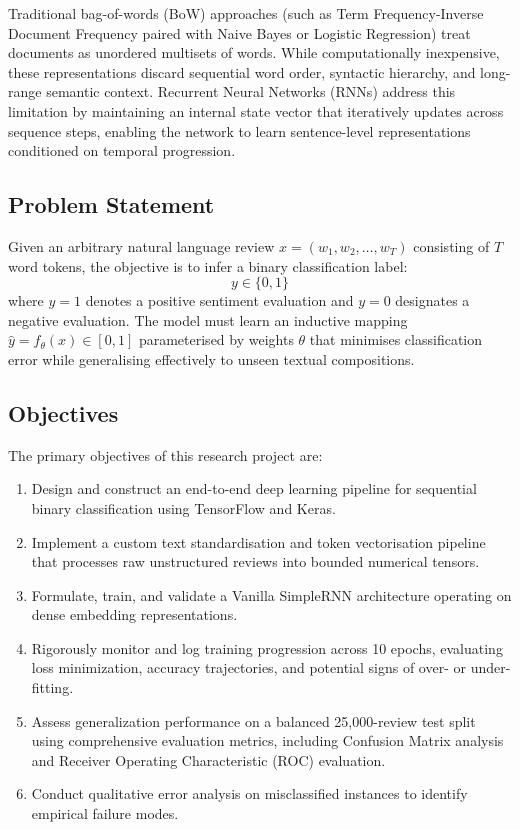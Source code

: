 \documentclass[11pt,a4paper]{article}
\begin{document}
Traditional bag-of-words (BoW) approaches (such as Term Frequency-Inverse Document Frequency paired with Naive Bayes or Logistic Regression) treat documents as unordered multisets of words. While computationally inexpensive, these representations discard sequential word order, syntactic hierarchy, and long-range semantic context. Recurrent Neural Networks (RNNs) address this limitation by maintaining an internal state vector that iteratively updates across sequence steps, enabling the network to learn sentence-level representations conditioned on temporal progression.

\subsection{Problem Statement}
Given an arbitrary natural language review $x = (w_1, w_2, \dots, w_T)$ consisting of $T$ word tokens, the objective is to infer a binary classification label:
\begin{equation}
y \in \{0, 1\}
\end{equation}
where $y = 1$ denotes a positive sentiment evaluation and $y = 0$ designates a negative evaluation. The model must learn an inductive mapping $\hat{y} = f_\theta(x) \in [0, 1]$ parameterised by weights $\theta$ that minimises classification error while generalising effectively to unseen textual compositions.

\subsection{Objectives}
The primary objectives of this research project are:
\begin{enumerate}
    \item Design and construct an end-to-end deep learning pipeline for sequential binary classification using TensorFlow and Keras.
    \item Implement a custom text standardisation and token vectorisation pipeline that processes raw unstructured reviews into bounded numerical tensors.
    \item Formulate, train, and validate a Vanilla SimpleRNN architecture operating on dense embedding representations.
    \item Rigorously monitor and log training progression across 10 epochs, evaluating loss minimization, accuracy trajectories, and potential signs of over- or under-fitting.
    \item Assess generalization performance on a balanced 25,000-review test split using comprehensive evaluation metrics, including Confusion Matrix analysis and Receiver Operating Characteristic (ROC) evaluation.
    \item Conduct qualitative error analysis on misclassified instances to identify empirical failure modes.
\end{enumerate}
\end{document}
